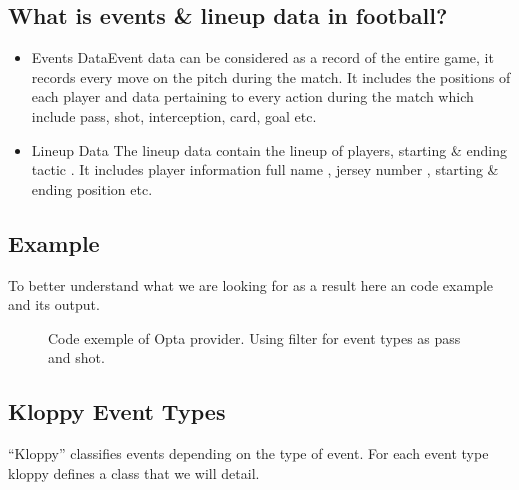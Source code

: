 \documentclass[letterpaper,10pt,english]{jupyterBook}
\begin{document}
\subsection{What is events \& line\sphinxhyphen{}up data in football?}
\label{\detokenize{Chap1/section1:what-is-events-line-up-data-in-football}}\begin{itemize}
\item {} 
\sphinxAtStartPar
Events DataEvent data can be considered as a record of the entire game, it records every move on the pitch during the match. It includes the positions of each player and data pertaining to every action during the match which include pass, shot, interception, card, goal etc.

\item {} 
\sphinxAtStartPar
Line\sphinxhyphen{}up Data
The line\sphinxhyphen{}up data contain the lineup of players, starting \& ending tactic . It includes player information full name , jersey number , starting \& ending position etc.

\end{itemize}


\subsection{Example}
\label{\detokenize{Chap1/section1:example}}
\sphinxAtStartPar
To better understand what we are looking for as a result here an code example and its output.

\begin{figure}[htbp]
\centering
\capstart

\noindent{}
\caption{Code exemple of Opta provider. Using filter for event types as pass and shot.}\label{\detokenize{Chap1/section1:optaexp-fig}}\end{figure}


\subsection{Kloppy Event Types}
\label{\detokenize{Chap1/section1:kloppy-event-types}}
\sphinxAtStartPar
“Kloppy” classifies events depending on the type of event.
For each event type kloppy defines a class that we will detail.
\end{document}
